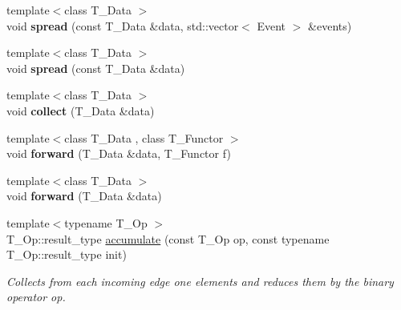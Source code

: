 \begin{DoxyCompactItemize}
\item 
\hypertarget{structgraybat_1_1CommunicationVertex_a8a64f187996fd556723997e5ff9dcca2}{}{\footnotesize template$<$class T\+\_\+\+Data $>$ }\\void {\bfseries spread} (const T\+\_\+\+Data \&data, std\+::vector$<$ Event $>$ \&events)\label{structgraybat_1_1CommunicationVertex_a8a64f187996fd556723997e5ff9dcca2}

\item 
\hypertarget{structgraybat_1_1CommunicationVertex_a3a0cbc8f98f2eeb60fbe20e437802878}{}{\footnotesize template$<$class T\+\_\+\+Data $>$ }\\void {\bfseries spread} (const T\+\_\+\+Data \&data)\label{structgraybat_1_1CommunicationVertex_a3a0cbc8f98f2eeb60fbe20e437802878}

\item 
\hypertarget{structgraybat_1_1CommunicationVertex_a11ef52a5a8fef1098b60b35c8913da94}{}{\footnotesize template$<$class T\+\_\+\+Data $>$ }\\void {\bfseries collect} (T\+\_\+\+Data \&data)\label{structgraybat_1_1CommunicationVertex_a11ef52a5a8fef1098b60b35c8913da94}

\item 
\hypertarget{structgraybat_1_1CommunicationVertex_aa8c10d97bde2b66352ce88a5bf3bad12}{}{\footnotesize template$<$class T\+\_\+\+Data , class T\+\_\+\+Functor $>$ }\\void {\bfseries forward} (T\+\_\+\+Data \&data, T\+\_\+\+Functor f)\label{structgraybat_1_1CommunicationVertex_aa8c10d97bde2b66352ce88a5bf3bad12}

\item 
\hypertarget{structgraybat_1_1CommunicationVertex_af7139cd8308d3a43060c31a24a9bb6db}{}{\footnotesize template$<$class T\+\_\+\+Data $>$ }\\void {\bfseries forward} (T\+\_\+\+Data \&data)\label{structgraybat_1_1CommunicationVertex_af7139cd8308d3a43060c31a24a9bb6db}

\item 
{\footnotesize template$<$typename T\+\_\+\+Op $>$ }\\T\+\_\+\+Op\+::result\+\_\+type \hyperlink{structgraybat_1_1CommunicationVertex_a8e222acd742cb03215c93220e19c24ed}{accumulate} (const T\+\_\+\+Op op, const typename T\+\_\+\+Op\+::result\+\_\+type init)
\begin{DoxyCompactList}\small\item\em Collects from each incoming edge one elements and reduces them by the binary operator op. \end{DoxyCompactList}\end{DoxyCompactItemize}
